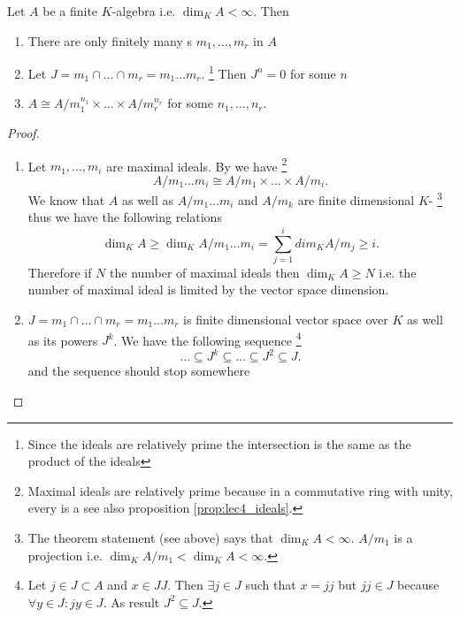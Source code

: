 \begin{theorem}
  Let $A$ be a finite $K$-algebra i.e.
  $\dim_K A < \infty$. Then
  \begin{enumerate}
  \item There are only finitely many s
    $m_1, \dots, m_r$ in $A$
  \item Let $J = m_1 \cap \dots \cap m_r = m_1 \dots m_r$.
    \footnote{
      Since the ideals are relatively prime the intersection is the
      same as the product of the ideals
    }
    Then
    $J^n = 0$ for some $n$
  \item
    $A \cong A/{m_1^{n_1}} \times \dots \times A/{m_r^{n_r}}$ for
    some $n_1, \dots, n_r$.    
  \end{enumerate}
  \begin{proof}
    \begin{enumerate}
    \item
      Let $m_1, \dots, m_i$ are maximal ideals. By
       we have
      \footnote{
        Maximal ideals are relatively prime because
        in a commutative ring with unity, every
         is a
         see also proposition
        \ref{prop:lec4_ideals}. 
      }
      \[
      A/m_1 \dots m_i \cong
      A/m_1 \times \dots \times A/m_i.
      \]
      We know that $A$ as well as $A/m_1 \dots m_i$ and $A/m_k$ are
      finite dimensional $K$-
      \footnote {
        The theorem statement (see above) says that
        $\dim_K A < \infty$. $A/m_1$ is a projection i.e.
        $\dim_K A/m_1 < \dim_K A < \infty$.
      }
      thus we have the
      following relations
      \[
      \dim_K A \ge \dim_K  A/m_1 \dots m_i  =
      \sum_{j=1}^i dim_K A/m_j \ge i.
      \]
      Therefore if $N$ the number of maximal ideals then
      $\dim_K A \ge N$ i.e. the number of maximal ideal is limited by
      the vector space dimension.
    \item
      $J = m_1 \cap \dots \cap m_r = m_1 \dots m_r$ is finite
      dimensional vector space over $K$ as well as its powers
      $J^k$. We have the following sequence
      \footnote {
        Let $j \in J \subset A$ and $x \in JJ$.
        Then $\exists j \in J$ such that $x = j j$
        but $j j \in J$ because $\forall y \in J: j y \in J$.
        As result $J^2 \subseteq J$.
      }
      \[
      \dots \subseteq J^k \subseteq \dots \subseteq
      J^2 \subseteq J.
      \]
      and the sequence should stop somewhere

\end{enumerate}
\end{proof}
\end{theorem}

